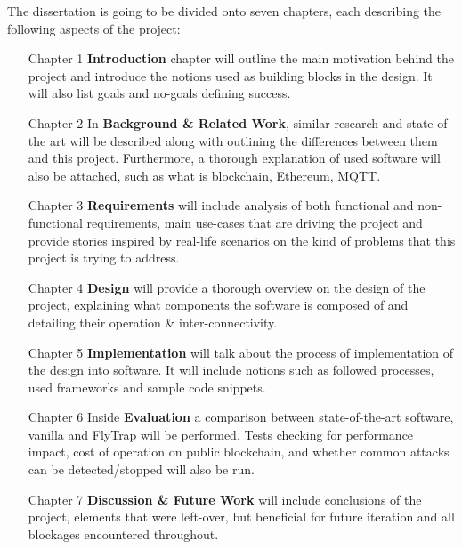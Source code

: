 The dissertation is going to be divided onto seven chapters, each describing the following aspects of the project:
\begin{itemize}[leftmargin=4.5em]
  \item[Chapter 1] \textbf{Introduction} chapter will outline the main motivation behind the project and introduce the notions used as building blocks in the design. It will also list goals and no-goals defining success.
  \item[Chapter 2] In \textbf{Background \& Related Work}, similar research and state of the art will be described along with outlining the differences between them and this project. Furthermore, a thorough explanation of used software will also be attached, such as what is blockchain, Ethereum, MQTT. 
  \item[Chapter 3] \textbf{Requirements} will include analysis of both functional and non-functional requirements, main use-cases that are driving the project and provide stories inspired by real-life scenarios on the kind of problems that this project is trying to address.
  \item[Chapter 4] \textbf{Design} will provide a thorough overview on the design of the project, explaining what components the software is composed of and detailing their operation \& inter-connectivity.
  \item[Chapter 5] \textbf{Implementation} will talk about the process of implementation of the design into software. It will include notions such as followed processes, used frameworks and sample code snippets.
  \item[Chapter 6] Inside \textbf{Evaluation} a comparison between state-of-the-art software, vanilla and FlyTrap will be performed. Tests checking for performance impact, cost of operation on public blockchain, and whether common attacks can be detected/stopped will also be run.
  \item[Chapter 7] \textbf{Discussion \& Future Work} will include conclusions of the project, elements that were left-over, but beneficial for future iteration and all blockages encountered throughout. 
\end{itemize}
